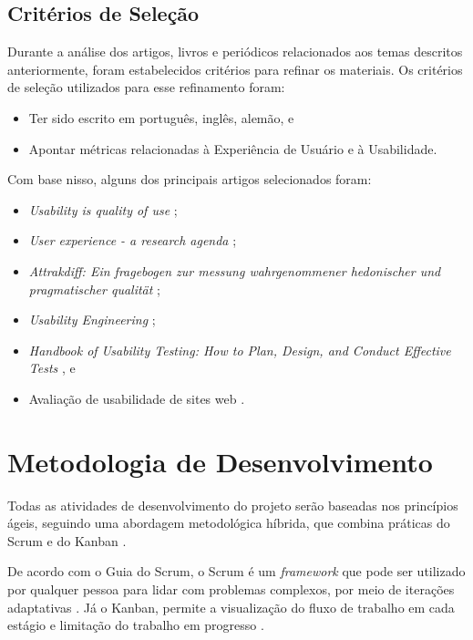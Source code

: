 \subsection{Critérios de Seleção}
\label{sec:Critérios de Selecao}
Durante a análise dos artigos, livros e periódicos relacionados aos temas descritos anteriormente, foram estabelecidos critérios para refinar os materiais. Os critérios de seleção utilizados para esse refinamento foram:

\begin{itemize}
	\item Ter sido escrito em português, inglês, alemão, e
	\item Apontar métricas relacionadas à Experiência de Usuário e à Usabilidade.
\end{itemize}

Com base nisso, alguns dos principais artigos selecionados foram:

\begin{itemize}
	\item \textit{Usability is quality of use} \cite{bevan1995};
	\item \textit{User experience - a research agenda} \cite{hassenzahl2006};
	\item \textit{Attrakdiff: Ein fragebogen zur messung wahrgenommener hedonischer und pragmatischer qualität} \cite{hassenzahl2003};
	\item \textit{Usability Engineering} \cite{nielsen1994usability};
	\item \textit{Handbook of Usability Testing: How to Plan, Design, and Conduct Effective Tests} \cite{rubin2011}, e
	\item Avaliação de usabilidade de sites web \cite{winckler2022}.
\end{itemize}

\section{Metodologia de Desenvolvimento}
\label{sec:Metodologia de Desenvolvimento}
Todas as atividades de desenvolvimento do projeto serão baseadas nos princípios ágeis, seguindo uma abordagem metodológica híbrida, que combina práticas do Scrum e do Kanban \cite{totvs2021} \cite{scrumguide2020}. 

De acordo com o Guia do Scrum, o Scrum é um \textit{framework} que pode ser utilizado por qualquer pessoa para lidar com problemas complexos, por meio de iterações adaptativas \cite{scrumguide2020}. Já o Kanban, permite 
a visualização do fluxo de trabalho em cada estágio e limitação do trabalho em progresso \cite{anderson2011}.

